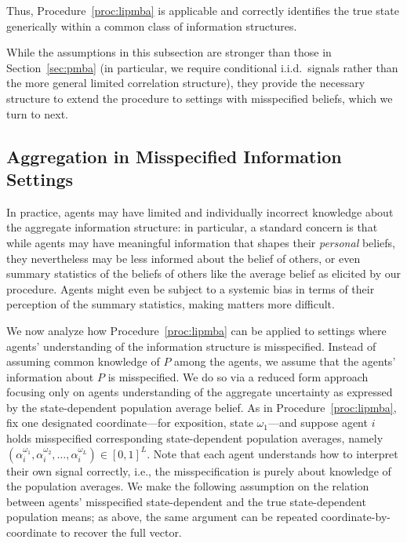 \documentclass[12pt,reqno]{amsart}
\begin{document}
Thus, Procedure~\ref{proc:lipmba} is applicable and correctly identifies the true state generically within a common class of information structures.

While the assumptions in this subsection are stronger than those in Section~\ref{sec:pmba} (in particular, we require conditional i.i.d.\ signals rather than the more general limited correlation structure), they provide the necessary structure to extend the procedure to settings with misspecified beliefs, which we turn to next.
\par

\subsection{Aggregation in Misspecified Information Settings}\label{sec:misspecified}
In practice, agents may have limited and individually incorrect knowledge about the aggregate information structure: in particular, a standard concern is that while agents may have meaningful information that shapes their \emph{personal} beliefs, they nevertheless may be less informed about the belief of others, or even summary statistics of the beliefs of others like the average belief as elicited by our procedure. Agents might even be subject to a systemic bias in terms of their perception of the summary statistics, making matters more difficult. 

We now analyze how Procedure~\ref{proc:lipmba} can be applied to settings where agents' understanding of the information structure is misspecified. Instead of assuming common knowledge of $P$ among the agents, we assume that the agents' information about $P$ is misspecified. We do so via a reduced form approach focusing only on agents understanding of the aggregate uncertainty as expressed by the state-dependent population average belief. As in Procedure~\ref{proc:lipmba}, fix one designated coordinate---for exposition, state $\omega_1$---and suppose agent $i$ holds misspecified corresponding state-dependent population averages, namely $(\alpha_{i}^{\omega_1},\alpha^{\omega_2}_{i},\ldots,\alpha_{i}^{\omega_L}) \in [0,1]^L$. Note that each agent understands how to interpret their own signal correctly, i.e., the misspecification is purely about knowledge of the population averages. We make the following assumption on the relation between agents' misspecified state-dependent and the true state-dependent population means; as above, the same argument can be repeated coordinate-by-coordinate to recover the full vector.
\end{document}
